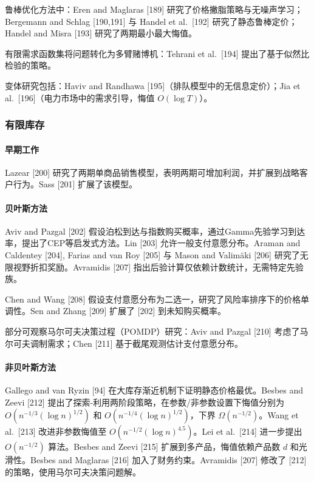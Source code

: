 鲁棒优化方法中：Eren and Maglaras {[}189{]} 研究了价格撇脂策略与无噪声学习；Bergemann and Schlag {[}190,191{]} 与 Handel et al.~{[}192{]} 研究了静态鲁棒定价；Handel and Misra {[}193{]} 研究了两期最小最大悔值。

有限需求函数集将问题转化为多臂赌博机：Tehrani et al.~{[}194{]} 提出了基于似然比检验的策略。

变体研究包括：Haviv and Randhawa {[}195{]}（排队模型中的无信息定价）；Jia et al.~{[}196{]}（电力市场中的需求引导，悔值 \(O(\log T)\)）。

\subsubsection{有限库存}\label{finite-inventory}

\paragraph{早期工作}\label{early-work-1}

Lazear {[}200{]} 研究了两期单商品销售模型，表明两期可增加利润，并扩展到战略客户行为。Sass {[}201{]} 扩展了该模型。

\paragraph{贝叶斯方法}\label{bayesian-approaches-1}

Aviv and Pazgal {[}202{]} 假设泊松到达与指数购买概率，通过Gamma先验学习到达率，提出了CEP等启发式方法。Lin {[}203{]} 允许一般支付意愿分布。Araman and Caldentey {[}204{]}, Farias and van Roy {[}205{]} 与 Mason and Valimäki {[}206{]} 研究了无限视野折扣奖励。Avramidis {[}207{]} 指出后验计算仅依赖计数统计，无需特定先验族。

Chen and Wang {[}208{]} 假设支付意愿分布为二选一，研究了风险率排序下的价格单调性。Sen and Zhang {[}209{]} 扩展了 {[}202{]} 到未知购买概率。

部分可观察马尔可夫决策过程（POMDP）研究：Aviv and Pazgal {[}210{]} 考虑了马尔可夫调制需求；Chen {[}211{]} 基于截尾观测估计支付意愿分布。

\paragraph{非贝叶斯方法}\label{non-bayesian-approaches-1}

Gallego and van Ryzin {[}94{]} 在大库存渐近机制下证明静态价格最优。Besbes and Zeevi {[}212{]} 提出了探索-利用两阶段策略，在参数/非参数设置下悔值分别为 \(O(n^{-1/3}(\log n)^{1/2})\) 和 \(O(n^{-1/4}(\log n)^{1/2})\)，下界 \(\Omega(n^{-1/2})\)。Wang et al.~{[}213{]} 改进非参数悔值至 \(O(n^{-1/2}(\log n)^{4.5})\)。Lei et al.~{[}214{]} 进一步提出 \(O(n^{-1/2})\) 算法。Besbes and Zeevi {[}215{]} 扩展到多产品，悔值依赖产品数 \(d\) 和光滑性。Besbes and Maglaras {[}216{]} 加入了财务约束。Avramidis {[}207{]} 修改了 {[}212{]} 的策略，使用马尔可夫决策问题解。

